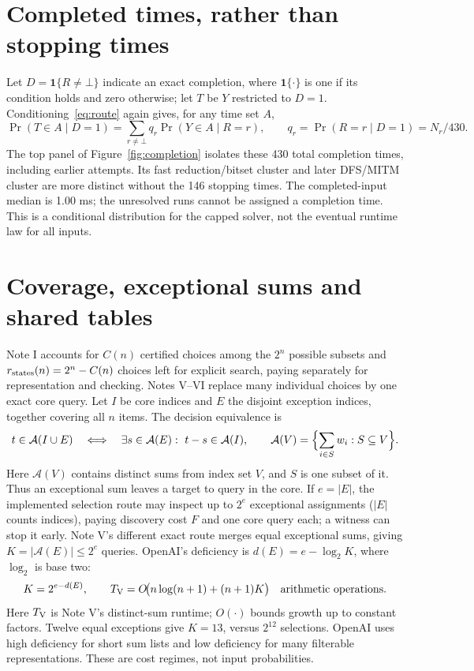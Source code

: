 \documentclass[10pt,english]{article}
\begin{document}
\section{Completed times, rather than stopping times}
Let $D=\mathbf1\{R\ne\bot\}$ indicate an exact completion, where
$\mathbf1\{\cdot\}$ is one if its condition holds and zero otherwise; let
$T$ be $Y$ restricted to $D=1$. Conditioning~\eqref{eq:route} again gives, for any
time set $A$,
\begin{equation}
 \Pr(T\in A\mid D=1)=\sum_{r\ne\bot}q_r\Pr(Y\in A\mid R=r),
 \qquad q_r=\Pr(R=r\mid D=1)=N_r/430. \label{eq:completion}
\end{equation}
The top panel of Figure~\ref{fig:completion} isolates these 430 total completion times,
including earlier attempts. Its fast reduction/bitset cluster and later
DFS/MITM cluster are more distinct without the 146 stopping times. The
completed-input median is 1.00 ms; the unresolved runs cannot be assigned a
completion time. This is a conditional distribution for the capped solver,
not the eventual runtime law for all inputs.

\section{Coverage, exceptional sums and shared tables}
Note I accounts for $C(n)$ certified choices among the $2^n$ possible subsets
and $r_{\rm states}(n)=2^n-C(n)$ choices left for explicit search, paying
separately for representation and checking. Notes V--VI replace many
individual choices by one exact core query. Let $I$ be core indices and $E$
the disjoint exception indices, together covering all $n$ items. The decision
equivalence is
\begin{equation}
 t\in\mathcal A(I\cup E)
 \quad\Longleftrightarrow\quad
 \exists s\in\mathcal A(E):\ t-s\in\mathcal A(I),
 \qquad \mathcal A(V)=\Bigl\{\sum_{i\in S}w_i:S\subseteq V\Bigr\}. \label{eq:core}
\end{equation}
Here $\mathcal A(V)$ contains distinct sums from index set $V$, and $S$ is one
subset of it. Thus an exceptional sum leaves a target to query in the core.
If $e=|E|$, the implemented selection route may inspect up to $2^e$
exceptional assignments ($|E|$ counts indices), paying discovery cost $F$
and one core query each; a witness can stop it early. Note V's different exact
route merges equal exceptional sums, giving $K=|\mathcal A(E)|\le 2^e$
queries. OpenAI's deficiency is $d(E)=e-\log_2K$, where $\log_2$ is base two:
\begin{equation}
 K=2^{e-d(E)},\qquad
 T_{\rm V}=O\!\bigl(n\log(n+1)+(n+1)K\bigr)
 \quad\text{arithmetic operations}. \label{eq:deficiency}
\end{equation}
Here $T_{\rm V}$ is Note V's distinct-sum runtime; $O(\cdot)$ bounds growth up
to constant factors. Twelve equal exceptions give $K=13$, versus $2^{12}$
selections. OpenAI uses high deficiency for short sum lists and low deficiency
for many filterable representations. These are cost regimes, not input
probabilities.
\end{document}

